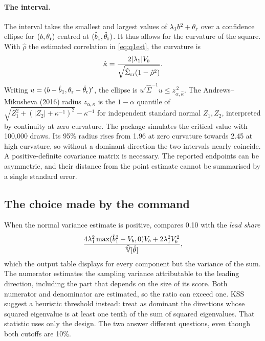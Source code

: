 \paragraph{The interval.}
The interval takes the smallest and largest values of $\lambda_1 b^2+\theta_{\rm r}$
over a confidence ellipse for $(b,\theta_{\rm r})$ centred at
$(\hat b_1,\hat\theta_{\rm r})$. It thus allows for the curvature of the
square. With $\hat\rho$ the estimated correlation in \eqref{eq:q1est}, the curvature is
\begin{equation}\label{eq:kappa}
 \hat\kappa=\frac{2|\lambda_1|V_b}
 {\sqrt{\hat\Sigma_{\rm rr}(1-\hat\rho^2)}} .
\end{equation}
Writing $u=(b-\hat b_1,\theta_{\rm r}-\hat\theta_{\rm r})'$, the ellipse
is $u'\hat\Sigma^{-1}u\le z_{\alpha,\hat\kappa}^{\,2}$.
The Andrews--Mikusheva (2016) radius $z_{\alpha,\kappa}$ is the
$1-\alpha$ quantile of
$\sqrt{Z_1^2+(|Z_2|+\kappa^{-1})^2}-\kappa^{-1}$ for independent
standard normal $Z_1,Z_2$, interpreted by continuity at zero curvature.
The package simulates the critical value with 100,000 draws. Its 95\% radius rises
from 1.96 at zero curvature towards 2.45 at high curvature, so without a dominant
direction the two intervals nearly coincide. A positive-definite covariance matrix is
necessary. The reported endpoints can be asymmetric, and their distance from the point
estimate cannot be summarised by a single standard error.

\subsection{The choice made by the command}
When the normal variance estimate is positive, \fevc{} compares 0.10 with the
\emph{lead share}
\[
 \frac{4\lambda_1^2\max(\hat b_1^2-V_b,0)V_b+2\lambda_1^2V_b^2}
      {\widehat{\mathbb{V}}[\hat\theta]} ,
\]
which the output table displays for every component but the variance of the sum. The
numerator estimates the
sampling variance attributable to the leading direction, including the part that
depends on the size of its score. Both numerator and denominator are estimated, so the
ratio can exceed one. KSS suggest a heuristic threshold instead: treat as dominant the
directions whose squared eigenvalue is at least one tenth of the sum of squared
eigenvalues. That statistic uses only the design. The two answer different questions,
even though both cutoffs are 10\%.


